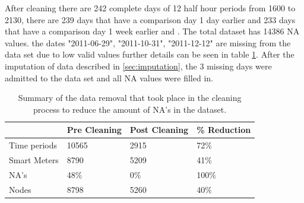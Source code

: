 \begin{figure}[ht]
\centering
{}
\label{fig:dataclean2}
\end{figure}


After cleaning there are 242 complete days of 12 half hour periods from 1600 to 2130, there are 239 days that have a comparison day 1 day earlier and 233 days that have a comparison day 1 week earlier and . The total dataset has 14386 NA values.
the dates "2011-06-29", "2011-10-31", "2011-12-12" are missing from the data set due to low valid values further details can be seen in table \ref{tab:nas}. After the  imputation of data described in \ref{sec:imputation}, the 3 missing days were admitted to the data set and  all NA values were filled in.

\begin{table}[ht]
\centering
\begin{tabular}{|l|l|l|l|} \hline
             & Pre Cleaning & Post Cleaning & \% Reduction \\ \hline
Time periods & 10565        & 2915           & 72\%      \\ \hline
Smart Meters & 8790         & 5209          & 41\%      \\ \hline
NA's         & 48\%         & 0\%           & 100\%     \\ \hline
Nodes        & 8798         & 5260          & 40\%      \\ \hline
\end{tabular}
\caption{Summary of the data removal that took place in the cleaning process to reduce the amount of NA's in the dataset.}
\label{tab:nas}
\end{table}

